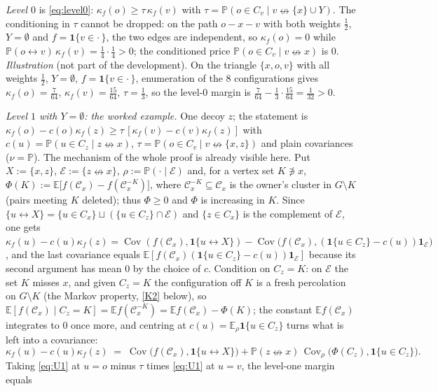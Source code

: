 \documentclass[11pt]{article}
\theoremstyle{definition}
\theoremstyle{remark}
\newcommand{\PP}{\mathbb{P}}
\newcommand{\E}{\mathbb{E}}
\DeclareMathOperator{\Cov}{Cov}
\newcommand{\con}{\leftrightarrow}
\newcommand{\ncon}{\nleftrightarrow}
\newcommand{\one}{\mathbf 1}
\newcommand{\eC}{\mathcal{C}}
\begin{document}
\emph{Level $0$} is \eqref{eq:level0}: $\kappa_f(o)\ge\tau\,\kappa_f(v)$ with $\tau=\PP(o\in C_v\mid v\ncon\{x\}\cup Y)$.  The conditioning in $\tau$
cannot be dropped: on the path $o\!-\!x\!-\!v$ with both weights $\tfrac12$, $Y=\emptyset$ and $f=\one\{v\in\cdot\,\}$, the two edges are independent, so
$\kappa_f(o)=0$ while $\PP(o\con v)\,\kappa_f(v)=\tfrac14\cdot\tfrac14>0$; the conditioned price $\PP(o\in C_v\mid v\ncon x)$ is $0$.
\emph{Illustration} (not part of the development).  On the triangle $\{x,o,v\}$ with all weights $\tfrac12$, $Y=\emptyset$, $f=\one\{v\in\cdot\,\}$,
enumeration of the $8$ configurations gives $\kappa_f(o)=\tfrac7{64}$, $\kappa_f(v)=\tfrac{15}{64}$, $\tau=\tfrac13$, so the level-$0$ margin is
$\tfrac7{64}-\tfrac13\cdot\tfrac{15}{64}=\tfrac1{32}>0$.

 \emph{Level $1$ with $Y=\emptyset$: the worked example.}  One decoy $z$; the statement is
$\kappa_f(o)-c(o)\kappa_f(z)\ge\tau\,[\kappa_f(v)-c(v)\kappa_f(z)]$ with $c(u)=\PP(u\in C_z\mid z\ncon x)$, $\tau=\PP(o\in C_v\mid v\ncon\{x,z\})$ and plain
covariances ($\nu=\PP$).  The mechanism of the whole proof is already visible here.  Put $X:=\{x,z\}$, $\mathcal E:=\{z\ncon x\}$,
$\rho:=\PP(\cdot\mid\mathcal E)$ and, for a vertex set $K\not\ni x$, $\Phi(K):=\E\bigl[f(\eC_x)-f(\eC^{-K}_x)\bigr]$, where $\eC^{-K}_x\subseteq\eC_x$ is
the owner's cluster in $G\setminus K$ (pairs meeting $K$ deleted); thus $\Phi\ge0$ and $\Phi$ is increasing in $K$.  Since
$\{u\con X\}=\{u\in C_x\}\sqcup(\{u\in C_z\}\cap\mathcal E)$ and $\{z\in C_x\}$ is the complement of $\mathcal E$, one gets
$\kappa_f(u)-c(u)\kappa_f(z)=\Cov(f(\eC_x),\one\{u\con X\})-\Cov\bigl(f(\eC_x),(\one\{u\in C_z\}-c(u))\one_{\mathcal E}\bigr)$, and the last
covariance equals $\E[f(\eC_x)(\one\{u\in C_z\}-c(u))\one_{\mathcal E}]$ because its second argument has mean $0$ by the choice of $c$.
Condition on $C_z=K$: on $\mathcal E$ the set $K$ misses $x$, and given $C_z=K$ the configuration off $K$ is a fresh percolation on
$G\setminus K$ (the Markov property, \ref{K2} below), so $\E[f(\eC_x)\mid C_z=K]=\E f(\eC^{-K}_x)=\E f(\eC_x)-\Phi(K)$; the constant $\E f(\eC_x)$
integrates to $0$ once more, and centring at $c(u)=\E_\rho\one\{u\in C_z\}$ turns what is left into a covariance:
\begin{equation}\label{eq:U1}
 \kappa_f(u)-c(u)\kappa_f(z)\;=\;\Cov\bigl(f(\eC_x),\one\{u\con X\}\bigr)+\PP(z\ncon x)\,\Cov_\rho\bigl(\Phi(C_z),\one\{u\in C_z\}\bigr).
\end{equation}
Taking \eqref{eq:U1} at $u=o$ minus $\tau$ times \eqref{eq:U1} at $u=v$, the level-one margin equals
\end{document}
